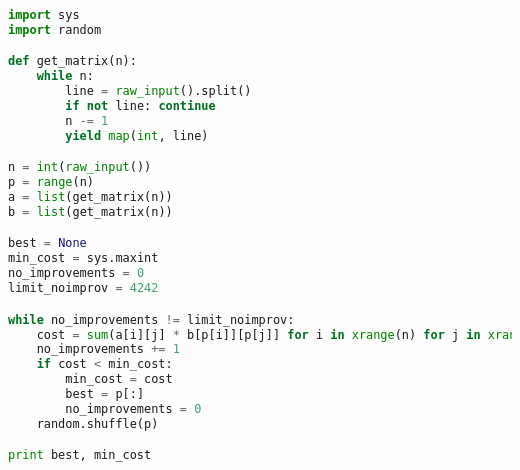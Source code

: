 \documentclass[a4paper, 12pt]{article}
\begin{document}
\begin{lstlisting}[language=Python,basicstyle=\footnotesize]
import sys
import random

def get_matrix(n):
    while n:
        line = raw_input().split()
        if not line: continue
        n -= 1
        yield map(int, line)

n = int(raw_input())
p = range(n)
a = list(get_matrix(n))
b = list(get_matrix(n))

best = None
min_cost = sys.maxint
no_improvements = 0
limit_noimprov = 4242

while no_improvements != limit_noimprov:
    cost = sum(a[i][j] * b[p[i]][p[j]] for i in xrange(n) for j in xrange(n))
    no_improvements += 1
    if cost < min_cost:
        min_cost = cost
        best = p[:]
        no_improvements = 0
    random.shuffle(p)

print best, min_cost
\end{lstlisting}
\end{document}
